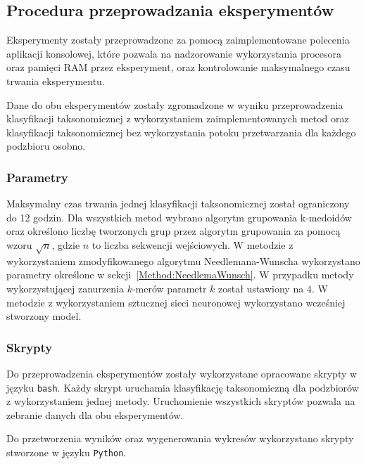     \subsection{Procedura przeprowadzania eksperymentów}

        Eksperymenty zostały przeprowadzone za pomocą zaimplementowane polecenia aplikacji konsolowej, które pozwala na nadzorowanie wykorzystania procesora oraz pamięci RAM przez eksperyment, oraz kontrolowanie maksymalnego czasu trwania eksperymentu.

        Dane do obu eksperymentów zostały zgromadzone w wyniku przeprowadzenia klasyfikacji taksonomicznej z wykorzystaniem zaimplementowanych metod oraz klasyfikacji taksonomicznej bez wykorzystania potoku przetwarzania dla każdego podzbioru osobno.

        \subsubsection{Parametry}

            Maksymalny czas trwania jednej klasyfikacji taksonomicznej został ograniczony do 12 godzin. Dla wszystkich metod wybrano algorytm grupowania k-medoidów oraz określono liczbę tworzonych grup przez algorytm grupowania za pomocą wzoru $\sqrt{n}$, gdzie $n$ to liczba sekwencji wejściowych. W metodzie z wykorzystaniem zmodyfikowanego algorytmu Needlemana-Wunscha wykorzystano parametry określone w sekcji~\ref{Method:NeedlemaWunsch}. W przypadku metody wykorzystującej zanurzenia $k$-merów parametr $k$ został ustawiony na $4$. W metodzie z wykorzystaniem sztucznej sieci neuronowej wykorzystano wcześniej stworzony model.

        \subsubsection{Skrypty}

            Do przeprowadzenia eksperymentów zostały wykorzystane opracowane skrypty w języku \texttt{bash}. Każdy skrypt uruchamia klasyfikację taksonomiczną dla podzbiorów z wykorzystaniem jednej metody. Uruchomienie wszystkich skryptów pozwala na zebranie danych dla obu eksperymentów.

            
            Do przetworzenia wyników oraz wygenerowania wykresów wykorzystano skrypty stworzone w języku \texttt{Python}.

